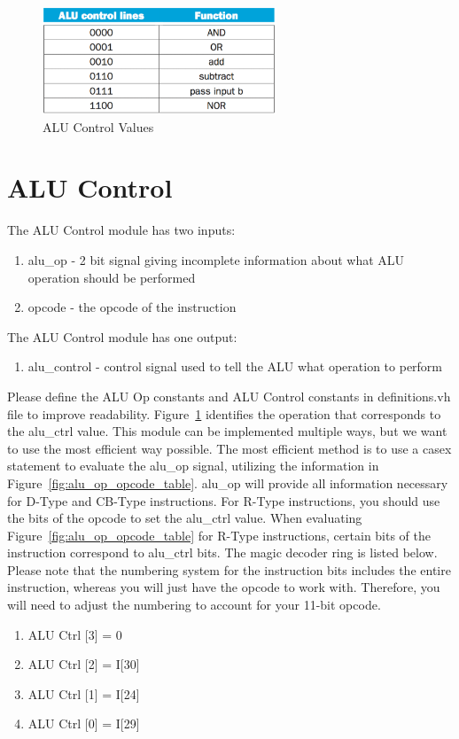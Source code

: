 \begin{figure}
	\caption{ALU Control Values}\label{fig:alu_control_table}
	\begin{center}
		\includegraphics[width=2.75in]{../images/alu_control_table.png}
	\end{center}
\end{figure} 

\section{ALU Control}
The ALU Control module has two inputs:
\begin{enumerate}
	\item alu\_op - 2 bit signal giving incomplete information about what ALU operation should be performed
	\item opcode - the opcode of the instruction
\end{enumerate}
The ALU Control module has one output:
\begin{enumerate}
	\item alu\_control - control signal used to tell the ALU what operation to perform
\end{enumerate}
Please define the ALU Op constants and ALU Control constants in definitions.vh file to improve readability.  Figure~\ref{fig:alu_control_table} identifies the operation that corresponds to the alu\_ctrl value.  This module can be implemented multiple ways, but we want to use the most efficient way possible.  The most efficient method is to use a casex statement to evaluate the alu\_op signal, utilizing the information in Figure~\ref{fig:alu_op_opcode_table}.  alu\_op will provide all information necessary for D-Type and CB-Type instructions.  For R-Type instructions, you should use the bits of the opcode to set the alu\_ctrl value.  When evaluating Figure~\ref{fig:alu_op_opcode_table} for R-Type instructions, certain bits of the instruction correspond to alu\_ctrl bits.  The magic decoder ring is listed below.  Please note that the numbering system for the instruction bits includes the entire instruction, whereas you will just have the opcode to work with.  Therefore, you will need to adjust the numbering to account for your 11-bit opcode.
\begin{enumerate}
	\item ALU Ctrl [3] = 0
	\item ALU Ctrl [2] = I[30]
	\item ALU Ctrl [1] = I[24]
	\item ALU Ctrl [0] = I[29]
\end{enumerate} 

